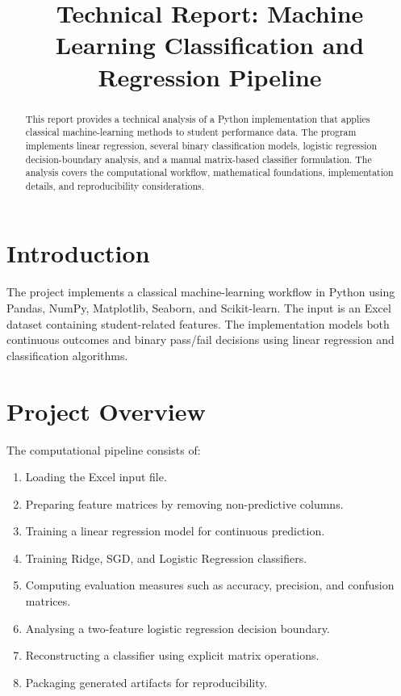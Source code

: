 \documentclass[11pt]{article}
\title{Technical Report: Machine Learning Classification and Regression Pipeline}
\author{}
\date{}
\begin{document}
\maketitle

\begin{abstract}
This report provides a technical analysis of a Python implementation that applies classical
machine-learning methods to student performance data. The program implements linear
regression, several binary classification models, logistic regression decision-boundary
analysis, and a manual matrix-based classifier formulation. The analysis covers the
computational workflow, mathematical foundations, implementation details, and
reproducibility considerations.
\end{abstract}

\section{Introduction}
The project implements a classical machine-learning workflow in Python using Pandas,
NumPy, Matplotlib, Seaborn, and Scikit-learn. The input is an Excel dataset containing
student-related features. The implementation models both continuous outcomes and binary
pass/fail decisions using linear regression and classification algorithms.

\section{Project Overview}
The computational pipeline consists of:
\begin{enumerate}
\item Loading the Excel input file.
\item Preparing feature matrices by removing non-predictive columns.
\item Training a linear regression model for continuous prediction.
\item Training Ridge, SGD, and Logistic Regression classifiers.
\item Computing evaluation measures such as accuracy, precision, and confusion matrices.
\item Analysing a two-feature logistic regression decision boundary.
\item Reconstructing a classifier using explicit matrix operations.
\item Packaging generated artifacts for reproducibility.
\end{enumerate}
\end{document}
